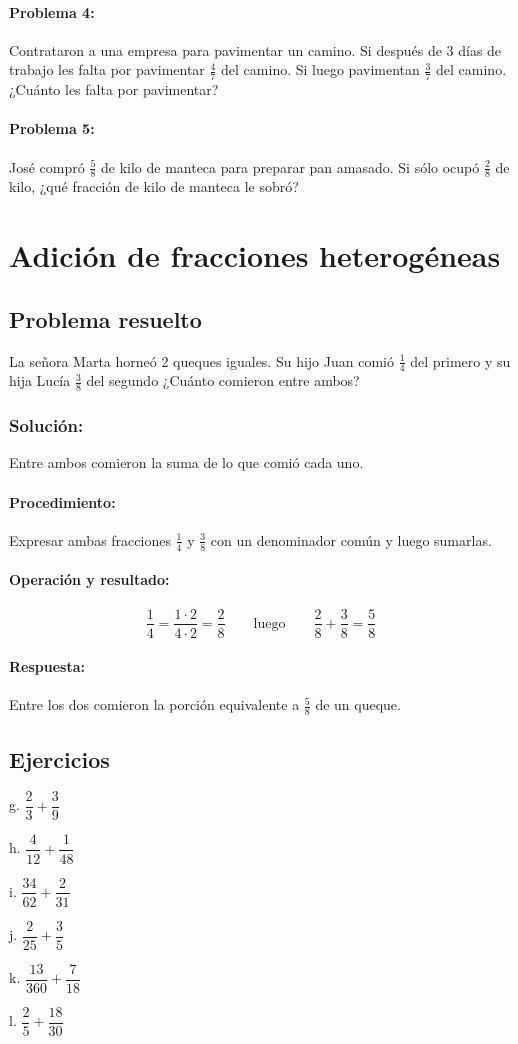 \documentclass[10pt,twoside]{article}
\begin{document}
\paragraph*{Problema 4:} Contrataron a una empresa para pavimentar un camino. Si después de 3 días de trabajo les falta por pavimentar $\frac{4}{7}$ del camino. Si luego pavimentan $\frac{3}{7}$ del camino. ¿Cuánto les falta por pavimentar?
\paragraph*{Problema 5:} José compró $\frac{5}{8}$ de kilo de manteca para preparar pan amasado. Si sólo ocupó $\frac{2}{8}$ de kilo, ¿qué fracción de kilo de manteca le sobró?
\section*{Adici\'{o}n de fracciones heterog\'{e}neas}
\subsection*{Problema resuelto}
La señora Marta horneó 2 queques iguales. Su hijo Juan comió $\frac{1}{4}$ del primero y su hija Lucía $\frac{3}{8}$ del segundo ¿Cuánto comieron entre ambos? 
\subsubsection*{Solución:} Entre ambos comieron la suma de lo que comió cada uno.
\paragraph*{Procedimiento:} Expresar ambas fracciones $\frac{1}{4}$ y $\frac{3}{8}$ con un denominador común y luego sumarlas.
\paragraph*{Operación y resultado:}
\[\dfrac{1}{4}=\dfrac{1\cdot 2}{4\cdot 2}=\dfrac{2}{8}\qquad \mbox {luego} \qquad \dfrac{2}{8}+\dfrac{3}{8}=\dfrac{5}{8}\]
\paragraph*{Respuesta:} Entre los dos comieron la porción equivalente a $\frac{5}{8}$ de un queque.
\subsection*{Ejercicios}
\begin{enumerate}
\begin{multicols}{3}
\item[g.] $\dfrac{2}{3}+\dfrac{3}{9}$
\item[h.] $\dfrac{4}{12}+\dfrac{1}{48}$
\item[i.] $\dfrac{34}{62}+\dfrac{2}{31}$
\item[j.] $\dfrac{2}{25}+\dfrac{3}{5}$
\item[k.] $\dfrac{13}{360}+\dfrac{7}{18}$
\item[l.] $\dfrac{2}{5}+\dfrac{18}{30}$
\end{multicols}
\end{enumerate}
\end{document}
